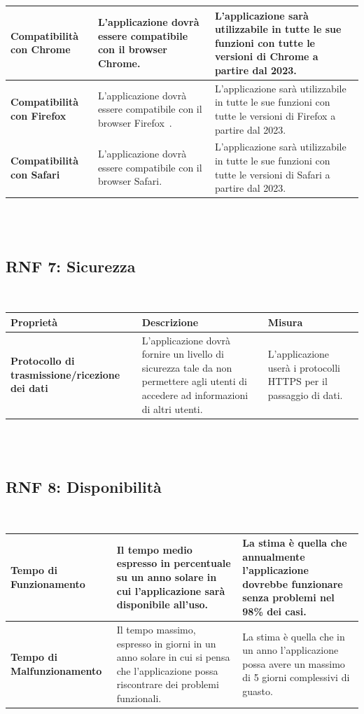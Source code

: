 \documentclass{article}
\begin{document}
\begin{tabular}{|p{4cm}|p{6cm}|p{4cm}|}
\hline
\textbf{Compatibilità con Chrome} & L’applicazione dovrà essere compatibile con il browser Chrome. & L’applicazione sarà utilizzabile in tutte le sue funzioni con tutte le versioni di Chrome a partire dal 2023. \\
\hline
\textbf{Compatibilità con Firefox} & L’applicazione dovrà essere compatibile con il browser Firefox . & L’applicazione sarà utilizzabile in tutte le sue funzioni con tutte le versioni di Firefox a partire dal 2023. \\
\hline
\textbf{Compatibilità con Safari} & L’applicazione dovrà essere compatibile con il browser Safari. & L’applicazione sarà utilizzabile in tutte le sue funzioni con tutte le versioni di Safari a partire dal 2023. \\
\hline
\end{tabular}\\\\


\subsection{RNF 7: Sicurezza}\\
 
\begin{tabular}{|p{4cm}|p{6cm}|p{4cm}|}
\hline
\textbf{Proprietà} & \textbf{Descrizione} & \textbf{Misura} \\
\hline
\textbf{Protocollo di trasmissione/ricezione dei dati} & L’applicazione dovrà fornire un livello di sicurezza tale da non permettere agli utenti di accedere ad informazioni di altri utenti. & L’applicazione userà i protocolli HTTPS per il passaggio di dati. \\
\hline

\end{tabular}\\\\



\subsection{RNF 8: Disponibilità}\\



\begin{tabular}{|p{4cm}|p{6cm}|p{4cm}|}
\hline
\textbf{Tempo di Funzionamento} & Il tempo medio espresso in percentuale su un anno solare in cui l’applicazione sarà disponibile all’uso. & La stima è quella che annualmente l’applicazione dovrebbe funzionare senza problemi nel 98\% dei casi. \\
\hline
\textbf{Tempo di Malfunzionamento} & Il tempo massimo, espresso in giorni in un anno solare in cui si pensa che l’applicazione possa riscontrare dei problemi funzionali. & La stima è quella che in un anno l’applicazione possa avere un massimo di 5 giorni complessivi di guasto. \\
\hline

\end{tabular}\\\\
\end{document}

